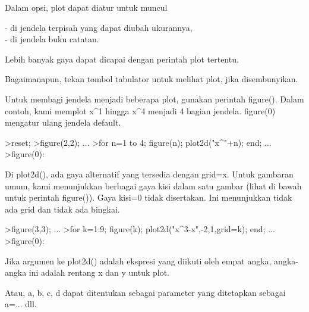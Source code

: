 \documentclass{article}
\begin{document}
\begin{eulernotebook}
\begin{eulercomment}
\begin{eulercomment}
\begin{eulercomment}
\begin{eulercomment}
\begin{eulercomment}
\begin{eulercomment}
\begin{eulercomment}
\begin{eulercomment}
\begin{eulercomment}
\begin{eulercomment}
\begin{eulercomment}
Dalam opsi, plot dapat diatur untuk muncul

- di jendela terpisah yang dapat diubah ukurannya,\\
- di jendela buku catatan.

Lebih banyak gaya dapat dicapai dengan perintah plot tertentu.

Bagaimanapun, tekan tombol tabulator untuk melihat plot, jika
disembunyikan.

Untuk membagi jendela menjadi beberapa plot, gunakan perintah
figure(). Dalam contoh, kami memplot x\textasciicircum{}1 hingga x\textasciicircum{}4 menjadi 4 bagian
jendela. figure(0) mengatur ulang jendela default.
\end{eulercomment}
\begin{eulerprompt}
>reset;
>figure(2,2); ...
>for n=1 to 4; figure(n); plot2d("x^"+n); end; ...
>figure(0):
\end{eulerprompt}
\begin{eulercomment}
Di plot2d(), ada gaya alternatif yang tersedia dengan grid=x. Untuk
gambaran umum, kami menunjukkan berbagai gaya kisi dalam satu gambar
(lihat di bawah untuk perintah figure()). Gaya kisi=0 tidak
disertakan. Ini menunjukkan tidak ada grid dan tidak ada bingkai.
\end{eulercomment}
\begin{eulerprompt}
>figure(3,3); ...
>for k=1:9; figure(k); plot2d("x^3-x",-2,1,grid=k); end; ...
>figure(0):
\end{eulerprompt}
\begin{eulercomment}
Jika argumen ke plot2d() adalah ekspresi yang diikuti oleh empat
angka, angka-angka ini adalah rentang x dan y untuk plot.

Atau, a, b, c, d dapat ditentukan sebagai parameter yang ditetapkan
sebagai a=... dll.


\end{eulercomment}
\end{eulercomment}
\end{eulercomment}
\end{eulercomment}
\end{eulercomment}
\end{eulercomment}
\end{eulercomment}
\end{eulercomment}
\end{eulercomment}
\end{eulercomment}
\end{eulercomment}
\end{eulernotebook}
\end{document}
